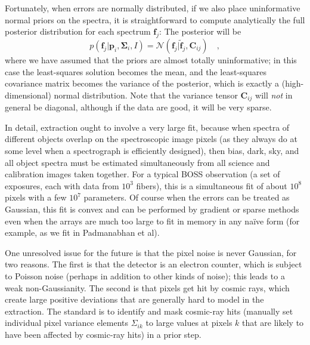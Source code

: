 \documentclass[12pt]{article}
\newcommand{\hmatrix}[1]{\boldsymbol{#1}}
\newcommand{\pixels}{\hmatrix{p}}
\newcommand{\flux}{\hmatrix{f}}
\newcommand{\fluxLSF}{\hmatrix{\tilde{f}}}
\newcommand{\pixelvariance}{\hmatrix{\Sigma}}
\newcommand{\covariance}{\hmatrix{C}}
\newcommand{\Normal}{\mathscr{N}}
\begin{document}
Fortunately, when errors are normally distributed, if we also place
uninformative normal priors on the spectra, it is straightforward to
compute analytically the full posterior distribution for each spectrum
$\flux_j$: The posterior will be
\begin{equation}
p(\flux_j|\pixels_i,\pixelvariance_i,I) =
  \Normal(\flux_j|\fluxLSF_j,\covariance_{ij}) \quad,
\end{equation}
where we have assumed that the priors are almost totally
uninformative; in this case the least-squares solution becomes the
mean, and the least-squares covariance matrix becomes the variance of
the posterior, which is exactly a (high-dimensional) normal
distribution.  Note that the variance tensor $\covariance_{ij}$ will
\emph{not} in general be diagonal, although if the data are good, it
will be very sparse.

In detail, extraction ought to involve a very large fit, because when
spectra of different objects overlap on the spectroscopic image pixels
(as they always do at some level when a spectrograph is efficiently
designed), then bias, dark, sky, and all object spectra must be
estimated simultaneously from all science and calibration images taken
together.  For a typical BOSS observation (a set of exposures, each
with data from $10^3$ fibers), this is a simultaneous fit of about
$10^8$ pixels with a few $10^7$ parameters.  Of course when the errors
can be treated as Gaussian, this fit is convex and can be performed by
gradient or sparse methods even when the arrays are much too large to
fit in memory in any na\"ive form (for example, as we fit in
Padmanabhan et al).

One unresolved issue for the future is that the pixel noise is never
Gaussian, for two reasons.  The first is that the detector is an
electron counter, which is subject to Poisson noise (perhaps in
addition to other kinds of noise); this leads to a weak
non-Gaussianity.  The second is that pixels get hit by cosmic rays,
which create large positive deviations that are generally hard to
model in the extraction.  The standard is to identify and mask
cosmic-ray hits (manually set individual pixel variance elements
$\Sigma_{ik}$ to large values at pixels $k$ that are likely to have
been affected by cosmic-ray hits) in a prior step.
\end{document}
